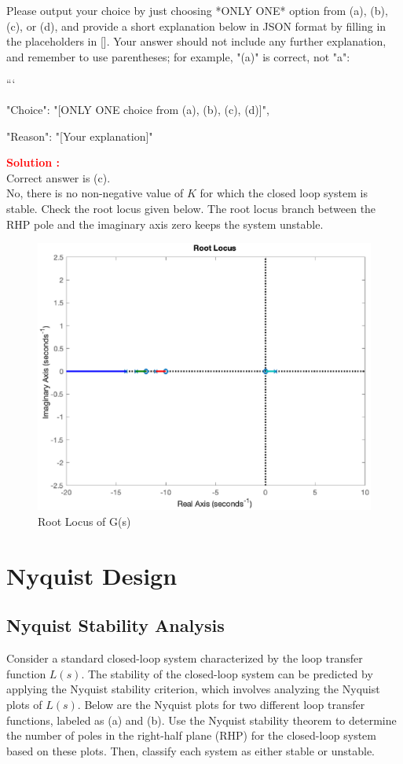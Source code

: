 \documentclass[12pt]{article}
\begin{document}
Please output your choice by just choosing *ONLY ONE* option from (a), (b), (c), or (d), and provide a short explanation below in JSON format by filling in the placeholders in []. Your answer should not include any further explanation, and remember to use parentheses; for example, "(a)" is correct, not "a": 

```
{

"Choice": "[ONLY ONE choice from (a), (b), (c), (d)]",

"Reason": "[Your explanation]"

}


\textbf{\textcolor{red}{Solution :}} \\
Correct answer is (c).\\
No, there is no non-negative value of $K$ for which the closed loop system is stable. Check the root locus given below. The root locus branch between the RHP pole and the imaginary axis zero keeps the system unstable. 

\begin{figure}[H]
    \centering
    \includegraphics[width=0.75\linewidth]{figs/7.7.eps}
    \caption{Root Locus of G(s)}
    \label{fig:prb46}
\end{figure}
\clearpage

\section{Nyquist Design}

\subsection{Nyquist Stability Analysis}

Consider a standard closed-loop system characterized by the loop transfer function $L(s)$. The stability of the closed-loop system can be predicted by applying the Nyquist stability criterion, which involves analyzing the Nyquist plots of $L(s)$. Below are the Nyquist plots for two different loop transfer functions, labeled as (a) and (b). Use the Nyquist stability theorem to determine the number of poles in the right-half plane (RHP) for the closed-loop system based on these plots. Then, classify each system as either stable or unstable.
\end{document}
